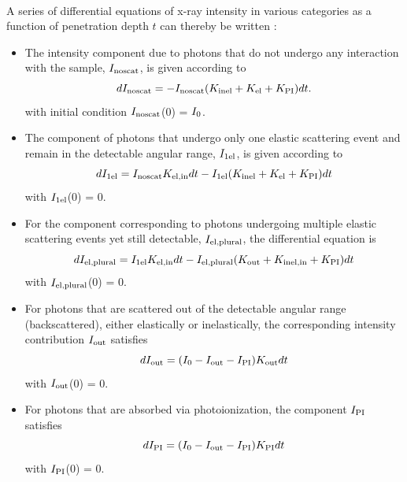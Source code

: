 \documentclass[review]{elsarticle}
\newcommand\nt{\textup{\scriptsize{0}}}
\newcommand\el{\textup{\scriptsize{el}}}
\newcommand\inel{\textup{\scriptsize{inel}}}
\newcommand\elin{\textup{\scriptsize{el,in}}}
\newcommand\inelin{\textup{\scriptsize{inel,in}}}
\newcommand\out{\textup{\scriptsize{out}}}
\newcommand\PI{\textup{\scriptsize{PI}}}
\newcommand\noscat{\textup{\scriptsize{noscat}}}
\newcommand\sel{\textup{\scriptsize{1el}}}
\newcommand\elpl{\textup{\scriptsize{el,plural}}}
\begin{document}
\paragraph{} A series of differential equations of x-ray intensity in various categories as a function of penetration depth $t$ can thereby be written \cite{Jacobsen:1998vj}:

\begin{itemize}

\item The intensity component due to photons that do not undergo any interaction with the sample, $I_{\noscat}$, is given according to
\begin{equation}
dI_{\noscat} = -I_{\noscat}(K_{\inel}+K_{\el}+K_{\PI}) dt.
\end{equation}
with initial condition $I_{\noscat}$(0) = $I_{\nt}$.

\item The component of photons that undergo only one elastic scattering event and remain in the detectable angular range, $I_{\sel}$, is given according to
\begin{equation}
dI_{\sel} = I_{\noscat}K_{\elin} dt - I_{\sel}(K_{\inel}+K_{\el}+K_{\PI}) dt
\end{equation}
with $I_{\sel}$(0) = 0.

\item For the component corresponding to photons undergoing multiple elastic scattering events yet still detectable, $I_{\elpl}$, the differential equation is
\begin{equation}
dI_{\elpl} = I_{\sel}K_{\elin} dt - I_{\elpl}(K_{\out}+K_{\inelin}+K_{\PI}) dt
\end{equation}
with $I_{\elpl}$(0) = 0.

\item For photons that are scattered out of the detectable angular range (backscattered), either elastically or inelastically, the corresponding intensity contribution $I_{\out}$ satisfies
\begin{equation}
dI_{\out} = (I_{\nt} - I_{\out} - I_{\PI})K_{\out} dt
\end{equation}
with $I_{\out}$(0) = 0.

\item For photons that are absorbed via photoionization, the component $I_{\PI}$ satisfies
\begin{equation}
dI_{\PI} = (I_{\nt} - I_{\out} - I_{\PI})K_{\PI} dt
\end{equation}
with $I_{\PI}$(0) = 0.


\end{itemize}
\end{document}
